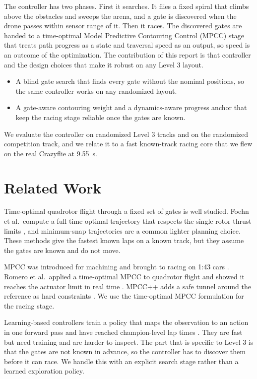 \documentclass[conference]{IEEEtran}
\begin{document}
The controller has two phases. First it searches. It flies a fixed spiral that climbs above the obstacles and sweeps the arena, and a gate is discovered when the drone passes within sensor range of it. Then it races. The discovered gates are handed to a time-optimal Model Predictive Contouring Control (MPCC) stage \cite{mpcc,lam} that treats path progress as a state and traversal speed as an output, so speed is an outcome of the optimization. The contribution of this report is that controller and the design choices that make it robust on any Level 3 layout.
\begin{itemize}
\item A blind gate search that finds every gate without the nominal positions, so the same controller works on any randomized layout.
\item A gate-aware contouring weight and a dynamics-aware progress anchor that keep the racing stage reliable once the gates are known.
\end{itemize}
We evaluate the controller on randomized Level 3 tracks and on the randomized competition track, and we relate it to a fast known-track racing core that we flew on the real Crazyflie at 9.55~s.

\section{Related Work}
\label{sec:related}
Time-optimal quadrotor flight through a fixed set of gates is well studied. Foehn et al.\ compute a full time-optimal trajectory that respects the single-rotor thrust limits \cite{foehn}, and minimum-snap trajectories \cite{minsnap} are a common lighter planning choice. These methods give the fastest known laps on a known track, but they assume the gates are known and do not move.

MPCC was introduced for machining \cite{lam} and brought to racing on 1:43 cars \cite{liniger}. Romero et al.\ applied a time-optimal MPCC to quadrotor flight and showed it reaches the actuator limit in real time \cite{mpcc}. MPCC++ adds a safe tunnel around the reference as hard constraints \cite{mpccpp}. We use the time-optimal MPCC formulation for the racing stage.

Learning-based controllers train a policy that maps the observation to an action in one forward pass and have reached champion-level lap times \cite{champion,songrl}. They are fast but need training and are harder to inspect. The part that is specific to Level 3 is that the gates are not known in advance, so the controller has to discover them before it can race. We handle this with an explicit search stage rather than a learned exploration policy.
\end{document}
